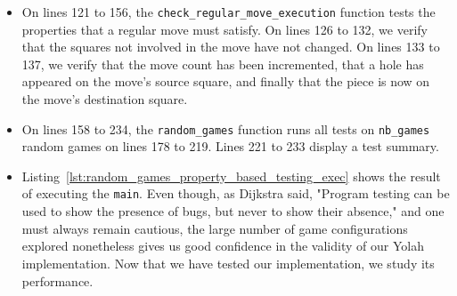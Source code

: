 \documentclass[12pt,a4paper,twoside,openright]{book}
\begin{document}
\begin{itemize}
\item On lines 121 to 156, the \texttt{check_regular_move_execution} function tests the properties that a regular move must satisfy. On lines 126 to 132, we verify that the squares not involved in the move have not changed. On lines 133 to 137, we verify that the move count has been incremented, that a hole has appeared on the move's source square, and finally that the piece is now on the move's destination square.

\item On lines 158 to 234, the \texttt{random_games} function runs all tests on \texttt{nb_games} random games on lines 178 to 219. Lines 221 to 233 display a test summary.

\item Listing~\ref{lst:random_games_property_based_testing_exec} shows the result of executing the \texttt{main}. Even though, as Dijkstra said, "Program testing can be used to show the presence of bugs, but never to show their absence," and one must always remain cautious, the large number of game configurations explored nonetheless gives us good confidence in the validity of our Yolah implementation. Now that we have tested our implementation, we study its performance.

\end{itemize}
\end{document}
